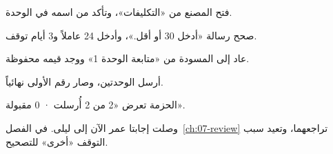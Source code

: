 \begin{rcchecklist}
\begin{checklist}
\item فتح المصنع من «التكليفات»، وتأكد من اسمه في الوحدة.
\item صحح رسالة «أدخل 30 أو أقل.»، وأدخل 24 عاملاً و3 أيام توقف.
\item عاد إلى المسودة من «متابعة الوحدة 1» ووجد قيمه محفوظة.
\item أرسل الوحدتين، وصار رقم الأولى نهائياً.
\item الحزمة تعرض «2 من 2 أُرسلت · 0 مقبولة».
\end{checklist}
\end{rcchecklist}

وصلت إجابتا عمر الآن إلى ليلى. في الفصل~\ref{ch:07-review} تراجعهما، وتعيد سبب التوقف «أخرى» للتصحيح.
